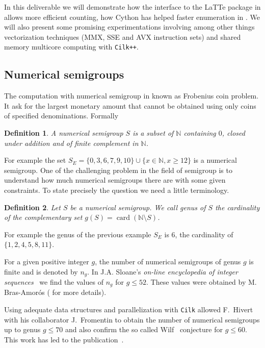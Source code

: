 \documentclass{deliverablereport}
\newcommand{\Cilk}{\texttt{Cilk}\xspace}
\newcommand{\CilkP}{\texttt{Cilk++}\xspace}
\newcommand{\NN}{\mathbb{N}}
\newtheorem{defi}{Definition}
\begin{document}
In this deliverable we will demonstrate how the interface to the LaTTe package
in \Sage allows more efficient counting, how Cython has helped faster enumeration
in \Sage. We will also present some promising experimentations involving among
other things vectorization techniques (MMX, SSE and AVX instruction sets) and
shared memory multicore computing with \CilkP.

\subsection{Numerical semigroups}

The computation with numerical semigroup in known as Frobenius coin
problem. It ask for the largest monetary amount that cannot be obtained using
only coins of specified denominations. Formally
\begin{defi}
  A \emph{numerical semigroup} $S$ is a subset of $\NN$ containing $0$, closed
  under addition and of finite complement in $\NN$.
\end{defi}
For example the set $S_E=\{0,3,6,7,9,10\}\cup\{x\in\NN, x\geq 12\}$
is a numerical semigroup. One of the challenging problem in the field of
semigroup is to understand how much numerical semigroups there are with some
given constraints. To state precisely the question we need a little
terminology.
\begin{defi}
  Let $S$ be a numerical semigroup. We call \emph{genus} of $S$ the
  cardinality of the complementary set $g(S)=\operatorname{card}(\NN\setminus
  S)$.
\end{defi}
For example the genus of the previous example $S_E$ is $6$, the cardinality of
$\{1,2,4,5,8,11\}$.

For a given positive integer $g$, the number of numerical semigroups of genus
$g$ is finite and is denoted by $n_g$. In J.A. Sloane's \emph{on-line
encyclopedia of integer sequences}~\cite{OEIS} we find the values of $n_g$
for $g\leq 52$. These values were obtained by M. Bras-Amor\'os
(\cite{BrasAmoros2008} for more details). 

Using adequate data structures and parallelization with \Cilk allowed
F.~Hivert with his collaborator J.~Fromentin to obtain the number of numerical
semigroups up to genus $g \leq 70$ and also confirm the so called
Wilf~\cite{Wilf} conjecture for $g \leq 60$. This work has led to the
publication~\cite{FromentinH16}.
\end{document}
